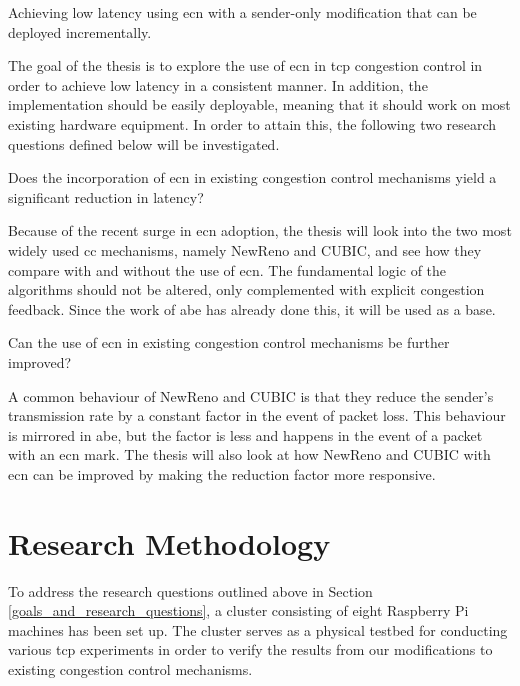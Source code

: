 \begin{statement}
    Achieving low latency using \gls{ecn} with a sender-only modification that can be deployed incrementally.
\end{statement}

The goal of the thesis is to explore the use of \gls{ecn} in \gls{tcp} congestion control in order to achieve low latency in a consistent manner. In addition, the implementation should be easily deployable, meaning that it should work on most existing hardware equipment. In order to attain this, the following two research questions defined below will be investigated.

\begin{statement}
    Does the incorporation of \gls{ecn} in existing congestion control mechanisms yield a significant reduction in latency?
\end{statement}

Because of the recent surge in \gls{ecn} adoption, the thesis will look into the two most widely used \gls{cc} mechanisms, namely NewReno and CUBIC, and see how they compare with and without the use of \gls{ecn}. The fundamental logic of the algorithms should not be altered, only complemented with explicit congestion feedback. Since the work of \gls{abe} has already done this, it will be used as a base.

\begin{statement}
    Can the use of \gls{ecn} in existing congestion control mechanisms be further improved?
\end{statement}

A common behaviour of NewReno and CUBIC is that they reduce the sender's transmission rate by a constant factor in the event of packet loss. This behaviour is mirrored in \gls{abe}, but the factor is less and happens in the event of a packet with an \gls{ecn} mark. The thesis will also look at how NewReno and CUBIC  with \gls{ecn} can be improved by making the reduction factor more responsive.









\section{Research Methodology}

To address the research questions outlined above in Section \ref{goals_and_research_questions}, a cluster consisting of eight Raspberry Pi machines has been set up. The cluster serves as a physical testbed for conducting various \gls{tcp} experiments in order to verify the results from our modifications to existing congestion control mechanisms.


